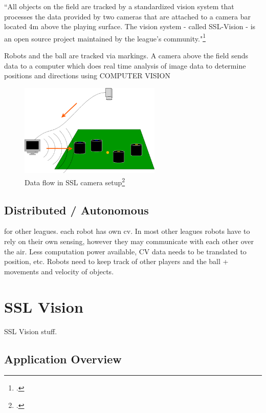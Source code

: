 ``All objects on the field are tracked by a standardized vision system that
processes the data provided by two cameras that are attached to a camera bar
located 4m above the playing surface. The vision system - called SSL-Vision - is
an open source project maintained by the league's community."\footcite[Cf.][]{robo_ssl_wiki}

Robots and the ball are tracked via markings. A camera above the field sends
data to a computer which does real time analysis of image data to determine
positions and directions using COMPUTER VISION

\begin{savenotes}
\begin{figure}[htbp]
\begin{center}
  \includegraphics[width=0.6\textwidth]{img/ssl_dataflow.png}
  \caption[Data flow in SSL camera setup]{Data flow in SSL camera setup\footcite[][]{robo_ssl_wiki}}
  \label{fig:ssl_dataflow}
\end{center}
\end{figure}
\end{savenotes}

\subsection{Distributed / Autonomous}
for other leagues. each robot has own cv.
In most other leagues robots have to rely on their own sensing, however they may
communicate with each other over the air.
Less computation power available, CV data needs to be translated to position,
etc. Robots need to keep track of other players and the ball + movements and
velocity of objects.



\newpage
\section{SSL Vision \label{sec:ssl-vision}}
SSL Vision stuff.

\subsection{Application Overview \label{sec:ssl-overview}}



